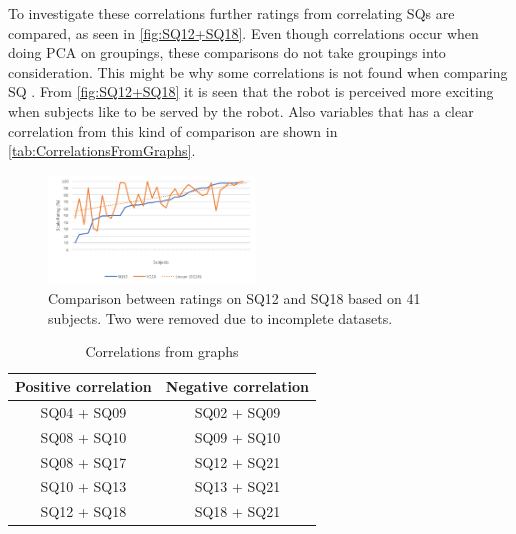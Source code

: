 To investigate these correlations further ratings from correlating SQs are compared, as seen in \autoref{fig:SQ12+SQ18}. Even though correlations occur when doing PCA on groupings, these comparisons do not take groupings into consideration. This might be why some correlations is not found when comparing SQ . From \autoref{fig:SQ12+SQ18} it is seen that the robot is perceived more exciting when subjects like to be served by the robot. Also variables that has a clear correlation from this kind of comparison are shown in \autoref{tab:CorrelationsFromGraphs}.
%
\begin{figure}[H]
	\centering
	\includegraphics[width = 0.49\textwidth]{Figure/SQ12+SQ18}
	\setlength{} 
	\caption{Comparison between ratings on SQ12 and SQ18 based on 41 subjects. Two were removed due to incomplete datasets.}
	\label{fig:SQ12+SQ18}
\end{figure}
\noindent
%
\begin{table}
	\centering
	\caption{Correlations from graphs}
	\label{tab:CorrelationsFromGraphs} 
	\begin{tabular}{ c|c }
		\centering
		Positive correlation & Negative correlation \\ \hline
		SQ04 + SQ09 & SQ02 + SQ09 \\ 
		SQ08 + SQ10 & SQ09 + SQ10 \\ 
		SQ08 + SQ17 & SQ12 + SQ21 \\ 
		SQ10 + SQ13 & SQ13 + SQ21 \\ 
		SQ12 + SQ18 & SQ18 + SQ21		
	\end{tabular}        
\end{table}
\noindent
%

